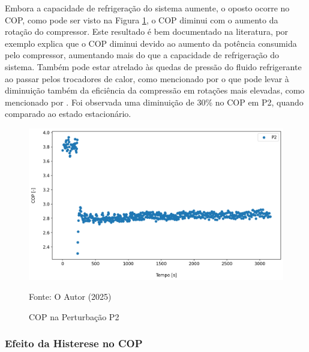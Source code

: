 Embora a capacidade de refrigeração do sistema aumente, o oposto ocorre no COP, como pode ser visto na Figura \ref{fig:Análise do COP Rotação}, o COP diminui com o aumento da rotação do compressor. Este resultado é bem documentado na literatura, por exemplo \textcite{MASCHE2021302} explica que o COP diminui devido ao aumento da potência consumida pelo compressor, aumentando mais do que a capacidade de refrigeração do sistema. Também pode estar atrelado às quedas de pressão do fluido refrigerante ao passar pelos trocadores de calor, como mencionado por \textcite{CONSTANTINO2022101048} o que pode levar à diminuição também da eficiência da compressão em rotações mais elevadas, como mencionado por \textcite{stoecker1998industrial}. Foi observada uma diminuição de 30\% no COP em P2, quando comparado ao estado estacionário.
\newpage
\begin{figure}[h]
    \centering
    \includegraphics[width=1\linewidth]{FigurasdoTexto/COP Perturbação Rot.png}
    \caption{COP na Perturbação P2}
    \label{fig:Análise do COP Rotação}
    {\footnotesize Fonte: O Autor (2025)}
\end{figure}

\subsubsection{Efeito da Histerese no COP}

